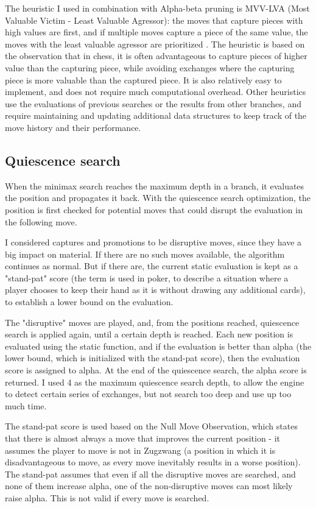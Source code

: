 The heuristic I used in combination with Alpha-beta pruning is MVV-LVA (Most Valuable Victim - Least Valuable Agressor): the moves that capture pieces with high values are first, and if multiple moves capture a piece of the same value, the moves with the least valuable agressor are prioritized \cite{mvv-lva}. The heuristic is based on the observation that in chess, it is often advantageous to capture pieces of higher value than the capturing piece, while avoiding exchanges where the capturing piece is more valuable than the captured piece. It is also relatively easy to implement, and does not require much computational overhead. Other heuristics use the evaluations of previous searches or the results from other branches, and require maintaining and updating additional data structures to keep track of the move history and their performance.

\subsection{Quiescence search}
\label{subsec:ch4sec2subsec2}

When the minimax search reaches the maximum depth in a branch, it evaluates the position and propagates it back. With the quiescence search optimization, the position is first checked for potential moves that could disrupt the evaluation in the following move.

I considered captures and promotions to be disruptive moves, since they have a big impact on material. If there are no such moves available, the algorithm continues as normal. But if there are, the current static evaluation is kept as a "stand-pat" score (the term is used in poker, to describe a situation where a player chooses to keep their hand as it is without drawing any additional cards), to establish a lower bound on the evaluation.

The "disruptive" moves are played, and, from the positions reached, quiescence search is applied again, until a certain depth is reached. Each new position is evaluated using the static function, and if the evaluation is better than alpha (the lower bound, which is initialized with the stand-pat score), then the evaluation score is assigned to alpha. At the end of the quiescence search, the alpha score is returned. I used 4 as the maximum quiescence search depth, to allow the engine to detect certain series of exchanges, but not search too deep and use up too much time.

The stand-pat score is used based on the Null Move Observation, which states
that there is almost always a move that improves the current position - it assumes the player to move is not in Zugzwang (a position in which it is disadvantageous to move, as every move inevitably results in a worse position). The stand-pat assumes that even if all the disruptive moves are searched, and none of them increase alpha, one of the non-disruptive moves can most likely raise alpha. This is not valid if every move is searched.

